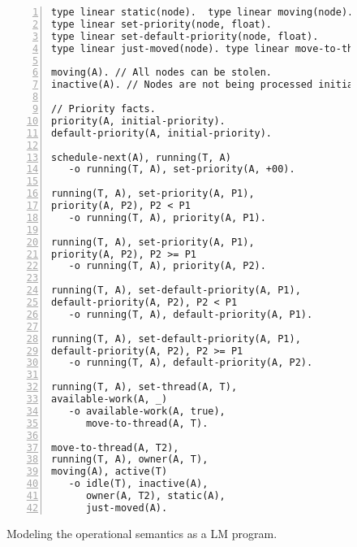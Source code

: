 \begin{figure}[h!]
\begin{Verbatim}[numbers=left,fontsize=\codesize,commandchars=*\#\&]
type linear static(node).  type linear moving(node).
type linear set-priority(node, float).
type linear set-default-priority(node, float).
type linear just-moved(node). type linear move-to-thread(node, thread).

moving(A). // All nodes can be stolen.
inactive(A). // Nodes are not being processed initially.

// Priority facts.
priority(A, initial-priority).
default-priority(A, initial-priority).

schedule-next(A), running(T, A)
   -o running(T, A), set-priority(A, +00).

running(T, A), set-priority(A, P1),
priority(A, P2), P2 < P1
   -o running(T, A), priority(A, P1).

running(T, A), set-priority(A, P1),
priority(A, P2), P2 >= P1
   -o running(T, A), priority(A, P2).

running(T, A), set-default-priority(A, P1),
default-priority(A, P2), P2 < P1
   -o running(T, A), default-priority(A, P1).

running(T, A), set-default-priority(A, P1),
default-priority(A, P2), P2 >= P1
   -o running(T, A), default-priority(A, P2).

running(T, A), set-thread(A, T),
available-work(A, _)
   -o available-work(A, true),
      move-to-thread(A, T).

move-to-thread(A, T2),
running(T, A), owner(A, T),
moving(A), active(T)
   -o idle(T), inactive(A),
      owner(A, T2), static(A),
      just-moved(A).
\end{Verbatim}
\caption{Modeling the operational semantics as a LM program.}
\label{code:threads:modeling}
\end{figure}

